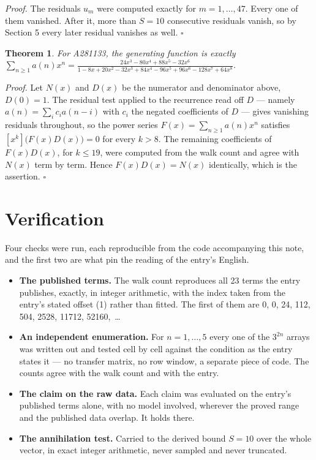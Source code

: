 \documentclass[11pt]{article}
\newtheorem{theorem}{Theorem}
\theoremstyle{definition}
\begin{document}
{\itshape Proof.} The residuals $u_m$ were computed exactly for $m = 1,\dots,47$. Every one of them vanished. After it, more than $S = 10$ consecutive residuals vanish, so by Section 5 every later residual vanishes as well. $\square$

\begin{theorem} For A281133, the generating function is exactly $\sum_{n\ge 1} a(n)x^n = \frac{24x^{3} - 80x^{4} + 88x^{5} - 32x^{6}}{1 - 8x + 20x^{2} - 32x^{3} + 84x^{4} - 96x^{5} + 96x^{6} - 128x^{7} + 64x^{8}}$.\end{theorem}

{\itshape Proof.} Let $N(x)$ and $D(x)$ be the numerator and denominator above, $D(0)=1$. The residual test applied to the recurrence read off $D$ --- namely $a(n) = \sum_i c_i a(n-i)$ with $c_i$ the negated coefficients of $D$ --- gives vanishing residuals throughout, so the power series $F(x)=\sum_{n\ge 1}a(n)x^n$ satisfies $[x^k]\bigl(F(x)D(x)\bigr) = 0$ for every $k > 8$. The remaining coefficients of $F(x)D(x)$, for $k \le 19$, were computed from the walk count and agree with $N(x)$ term by term. Hence $F(x)D(x) = N(x)$ identically, which is the assertion. $\square$

\section{Verification}

Four checks were run, each reproducible from the code accompanying this note, and the first two are what pin the reading of the entry's English.

\begin{itemize}

\item {\bfseries The published terms.} The walk count reproduces all 23 terms the entry publishes, exactly, in integer arithmetic, with the index taken from the entry's stated offset (1) rather than fitted. The first of them are 0, 0, 24, 112, 504, 2528, 11712, 52160,~\dots

\item {\bfseries An independent enumeration.} For $n = 1,\dots,5$ every one of the $3^{2n}$ arrays was written out and tested cell by cell against the condition as the entry states it --- no transfer matrix, no row window, a separate piece of code. The counts agree with the walk count and with the entry.

\item {\bfseries The claim on the raw data.} Each claim was evaluated on the entry's published terms alone, with no model involved, wherever the proved range and the published data overlap. It holds there.

\item {\bfseries The annihilation test.} Carried to the derived bound $S = 10$ over the whole vector, in exact integer arithmetic, never sampled and never truncated.

\end{itemize}
\end{document}
